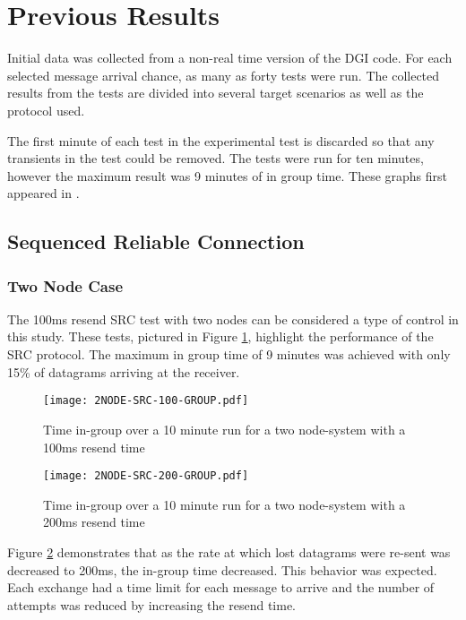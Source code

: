 \section{Previous Results}
Initial data was collected from a non-real time version of the DGI code.
For each selected message arrival chance, as many as forty tests were run.
The collected results from the tests are divided into several target scenarios as well as the protocol used.

The first minute of each test in the experimental test is discarded so that any transients in the test could be removed.
The tests were run for ten minutes, however the maximum result was 9 minutes of in group time.
These graphs first appeared in \cite{CRITIS2012}.

\subsection{Sequenced Reliable Connection}

\subsubsection{Two Node Case}

The 100ms resend SRC test with two nodes can be considered a type of control in this study.
These tests, pictured in Figure \ref{fig:IGT-SRC-2NODE-100}, highlight the performance of the SRC protocol.
The maximum in group time of 9 minutes was achieved with only 15\% of datagrams arriving at the receiver. 

\begin{figure}[!h]
\centering
\texttt{[image: 2NODE-SRC-100-GROUP.pdf]}
\caption{Time in-group over a 10 minute run for a two node-system with a 100ms resend time}
\label{fig:IGT-SRC-2NODE-100}
\end{figure}

\begin{figure}[!h]
\centering
\texttt{[image: 2NODE-SRC-200-GROUP.pdf]}
\caption{Time in-group over a 10 minute run for a two node-system with a 200ms resend time}
\label{fig:IGT-SRC-2NODE-200}
\end{figure}

Figure \ref{fig:IGT-SRC-2NODE-200} demonstrates that as the rate at which lost datagrams were re-sent was decreased to 200ms, the in-group time decreased.
This behavior was expected.
Each exchange had a time limit for each message to arrive and the number of attempts was reduced by increasing the resend time.

